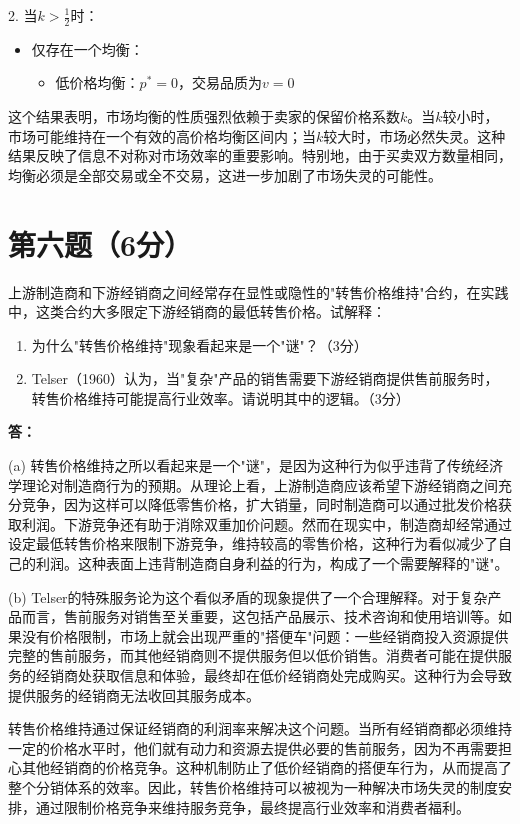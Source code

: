 \documentclass[12pt]{article}
\begin{document}
2. 当$k>\frac{1}{2}$时：
\begin{itemize}
\item 仅存在一个均衡：
    \begin{itemize}
    \item 低价格均衡：$p^*=0$，交易品质为$v=0$
    \end{itemize}
\end{itemize}

这个结果表明，市场均衡的性质强烈依赖于卖家的保留价格系数$k$。当$k$较小时，市场可能维持在一个有效的高价格均衡区间内；当$k$较大时，市场必然失灵。这种结果反映了信息不对称对市场效率的重要影响。特别地，由于买卖双方数量相同，均衡必须是全部交易或全不交易，这进一步加剧了市场失灵的可能性。

\section*{第六题（6分）}
上游制造商和下游经销商之间经常存在显性或隐性的"转售价格维持"合约，在实践中，这类合约大多限定下游经销商的最低转售价格。试解释：

\begin{enumerate}
\item 为什么"转售价格维持"现象看起来是一个"谜"？（3分）
\item Telser（1960）认为，当"复杂"产品的销售需要下游经销商提供售前服务时，转售价格维持可能提高行业效率。请说明其中的逻辑。（3分）
\end{enumerate}

\noindent\textbf{答：}

(a) 转售价格维持之所以看起来是一个"谜"，是因为这种行为似乎违背了传统经济学理论对制造商行为的预期。从理论上看，上游制造商应该希望下游经销商之间充分竞争，因为这样可以降低零售价格，扩大销量，同时制造商可以通过批发价格获取利润。下游竞争还有助于消除双重加价问题。然而在现实中，制造商却经常通过设定最低转售价格来限制下游竞争，维持较高的零售价格，这种行为看似减少了自己的利润。这种表面上违背制造商自身利益的行为，构成了一个需要解释的"谜"。

(b) Telser的特殊服务论为这个看似矛盾的现象提供了一个合理解释。对于复杂产品而言，售前服务对销售至关重要，这包括产品展示、技术咨询和使用培训等。如果没有价格限制，市场上就会出现严重的"搭便车"问题：一些经销商投入资源提供完整的售前服务，而其他经销商则不提供服务但以低价销售。消费者可能在提供服务的经销商处获取信息和体验，最终却在低价经销商处完成购买。这种行为会导致提供服务的经销商无法收回其服务成本。

转售价格维持通过保证经销商的利润率来解决这个问题。当所有经销商都必须维持一定的价格水平时，他们就有动力和资源去提供必要的售前服务，因为不再需要担心其他经销商的价格竞争。这种机制防止了低价经销商的搭便车行为，从而提高了整个分销体系的效率。因此，转售价格维持可以被视为一种解决市场失灵的制度安排，通过限制价格竞争来维持服务竞争，最终提高行业效率和消费者福利。
\end{document}
